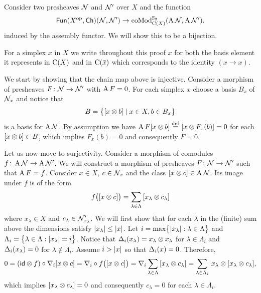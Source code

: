 
Consider two presheaves $\cN$ and $\cN'$ over $X$ and the function
\[
\Fun(X^\op, \Ch)(\cN, \cN') \to \coMod^{\Sym_2}_{\chains(X)}(\assembly \cN, \assembly \cN').
\]
induced by the assembly functor.
We will show this to be a bijection.

For a simplex $x$ in $X$ we write throughout this proof $x$ for both the basis element it represents in $\chains(X)$ and in $\chains(\bar x)$ which corresponds to the identity $(x \to x)$.

We start by showing that the chain map above is injective.
Consider a morphism of presheaves $F \colon \cN \to \cN'$ with $\assembly F = 0$.
For each simplex $x$ choose a basis $B_x$ of $\cN_x$ and notice that
\[
B = \set[\big]{[x \ot b] \mid x \in X, b \in B_x}
\]
is a basis for $\assembly \cN$.
By assumption we have $\assembly F [x \ot b] \defeq [x \ot F_x(b)] = 0$ for each $[x \ot b] \in B$, which implies $F_x(b) = 0$ and consequently $F = 0$.

Let us now move to surjectivity.
Consider a morphism of comodules $f \colon \assembly \cN \to \assembly \cN'$.
We will construct a morphism of presheaves $F \colon \cN \to \cN'$ such that $\assembly F = f$.
Consider $x \in X$, $c \in \cN_x$ and the class $[x \ot c] \in \assembly \cN$.
Its image under $f$ is of the form
\[
f \big( [x \ot c] \big) = \sum_{\lambda \in \Lambda} \, [x_\lambda \ot c_\lambda]
\]
where $x_\lambda \in X$ and $c_\lambda \in \cN'_{x_\lambda}$.
We will first show that for each $\lambda$ in the (finite) sum above the dimensions satisfy $\bars{x_\lambda} \leq \bars{x}$.
Let $i = \max \set[\big]{\bars{x_\lambda} : \lambda \in \Lambda}$ and $\Lambda_i = \set[\big]{\lambda \in \Lambda : \bars{x_\lambda} = i}$.
Notice that $\copr_i(x_{\lambda}) = x_{\lambda} \ot x_{\lambda}$ for $\lambda \in \Lambda_i$ and $\copr_i(x_{\lambda}) = 0$ for $\lambda \notin \Lambda_i$.
Assume $i > \bars{x}$ so that $\copr_i(x) = 0$.
Therefore,
\begin{align*}
	0 =
	(\id \ot f) \circ \nabla_i [x \ot c] =
	\nabla_i \circ f \big( [x \ot c] \big) =
	\nabla_i \sum_{\lambda \in \Lambda} \, [x_\lambda \ot c_\lambda] =
	\sum_{\lambda \in \Lambda_i} \, x_\lambda \ot [x_\lambda \ot c_\lambda],
\end{align*}
which implies $[x_\lambda \ot c_\lambda] = 0$ and consequently $c_{\lambda} = 0$ for each $\lambda \in \Lambda_i$.

